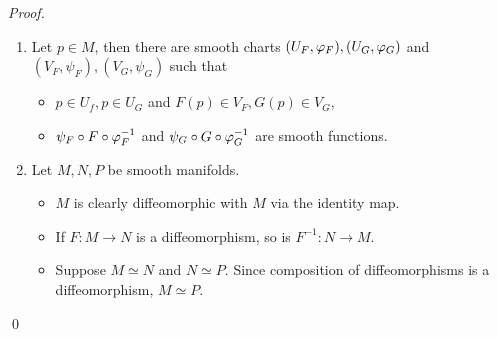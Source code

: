 \begin{proof}
\begin{enumerate}
    \item Let $p \in M$, then there are smooth charts $(U_F, \varphi_F), (U_G, \varphi_G)$ and $(V_F, \psi_F), (V_G, \psi_G)$ such that 
    \begin{itemize}
        \item $p \in U_f, p \in U_G$ and $F(p) \in V_F, G(p) \in V_G$,
        \item $\psi_F \circ F \circ \varphi_F^{-1}$ and $\psi_G \circ G \circ \varphi_G^{-1}$ are smooth functions. 
    \end{itemize}
    \item Let $M, N, P$ be smooth manifolds. 
    \begin{itemize}
        \item $M$ is clearly diffeomorphic with $M$ via the identity map. 
        \item If $F:M \to N$ is a diffeomorphism, so is $F^{-1}: N \to M$. 
        \item Suppose $M \simeq N$ and $N \simeq P$. Since composition of diffeomorphisms is a diffeomorphism, $M \simeq P$.
    \end{itemize}
    \end{enumerate} \qed 
\end{proof}

